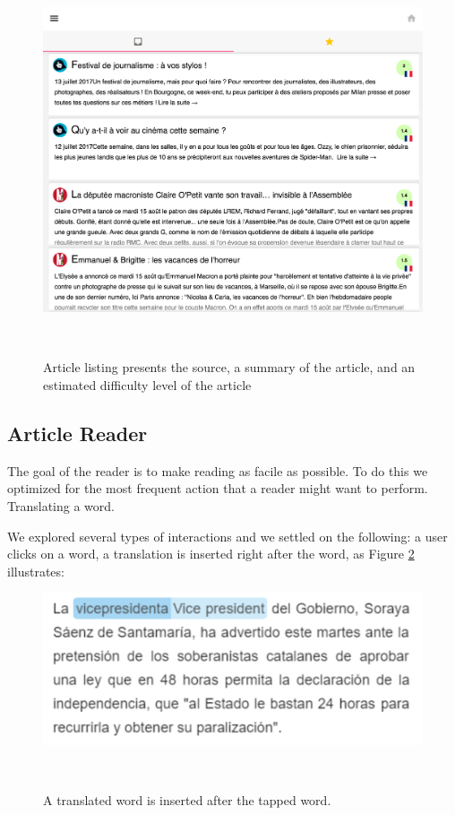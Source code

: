 \begin{figure}[h!]
\centering
  \includegraphics[width=0.95\columnwidth]{figures/article_listing}
  \caption{Article listing presents the source, a summary of the article, and an estimated difficulty level of the article }~\label{fig:registrations}
\end{figure}


\subsection{Article Reader}

The goal of the reader is to make reading as facile as possible. To do this we optimized for the most frequent action that a reader might want to perform. Translating a word. 

We explored several types of interactions and we settled on the following: a user clicks on a word, a translation is inserted right after the word, as Figure \ref{fig:translated_word} illustrates: 

\begin{figure}[h!]
\centering
  \includegraphics[width=0.8\columnwidth]{figures/translated_word}
  \caption{A translated word is inserted after the tapped word.}~\label{fig:translated_word}
\end{figure}

